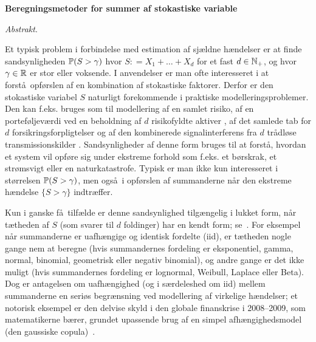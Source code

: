 \newpage

\begin{center}
{\large \bfseries Beregningsmetoder for summer af stokastiske variable}

\medskip
{\em Abstrakt\/}.
\end{center}

Et typisk problem i forbindelse med estimation af sj{\ae}ldne h{\ae}ndelser er at finde sandsynligheden $\operatorname{{\mathbb P}} (S> \gamma)$ hvor $S: = X_1 + \dots + X_d$ for et fast $d \in \mathbb{N}_+$, og hvor $\gamma \in \mathbb{R}$ er stor eller voksende. I anvendelser er man ofte interesseret i at forst\aa\ opf{\o}rslen af en kombination af stokastiske faktorer. Derfor er den stokastiske variabel $S$ naturligt forekommende i praktiske modelleringsproblemer.
Den kan f.eks. bruges som til modellering af en samlet risiko, af en portef{\o}ljev{\ae}rdi ved en beholdning af $d$ risikofyldte aktiver \cite {mcneil2015quantitative, Rueschendorf2013}, af det samlede tab for $d$ forsikringsforpligtelser \cite {asmussen2010ruin, klugman2012loss} og af den kombinerede signalinterferens fra $d$ trådl{\o}se transmissionskilder \cite {fischione2007approximation}.
Sandsynligheder af denne form bruges til at forst\aa , hvordan et system vil opf{\o}re sig under ekstreme forhold som f.eks. et b\o rskrak, et str\o msvigt eller en naturkatastrofe. Typisk er man ikke kun interesseret i st\o rrelsen $\operatorname{{\mathbb P}} (S> \gamma) $, men ogs\aa\ i opf{\o}rslen af summanderne n\aa r den ekstreme h\ae ndelse $\{S> \gamma \}$ indtr\ae ffer.

Kun i ganske f\aa\ tilf\ae lde er denne sandsynlighed tilg\ae ngelig i lukket form, n\aa r t{\ae}theden af $S$ (som svarer til $d$ foldinger) har en kendt form; se~\cite {nadarajah2008review}.
For eksempel n\aa r summanderne er uafh{\ae}ngige og identisk fordelte (iid), er t\ae theden nogle gange nem at beregne (hvis summandernes fordeling er eksponentiel, gamma, normal, binomial, geometrisk eller negativ binomial), og andre gange er det ikke muligt (hvis summandernes fordeling er lognormal, Weibull, Laplace eller Beta).
Dog er antagelsen om uafh{\ae}ngighed (og i s\ae rdeleshed om iid) mellem summanderne en seri\o s begr{\ae}nsning ved modellering af virkelige h{\ae}ndelser; et notorisk eksempel er den delvise skyld i den globale finanskrise i 2008--2009, som matematikerne b{\ae}rer, grundet upassende brug af en simpel afh{\ae}ngighedsmodel (den gaussiske copula)~\cite {salmon2009recipe}.

